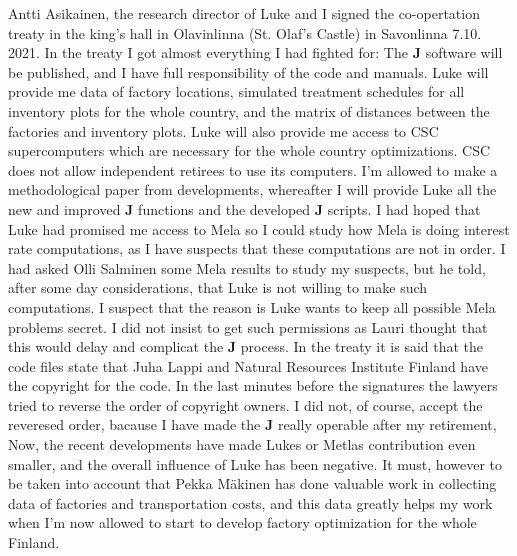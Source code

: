 Antti Asikainen, the research director of Luke and I signed the co-opertation treaty in the king's hall in
Olavinlinna (St. Olaf's Castle) in Savonlinna 7.10. 2021.
In the treaty I got almost everything I had
fighted for: The \textbf{J} software will be published, and I have
full responsibility of the code and manuals.
Luke will provide me data of factory locations, simulated treatment schedules for
all inventory plots for the whole country, and the matrix of distances between the
factories and inventory plots. Luke will also provide me access to CSC
supercomputers which are necessary for the whole country optimizations. CSC does not allow
independent retirees to use its computers. I'm allowed to make a methodological
paper from developments, whereafter I will provide Luke all the
new and improved \textbf{J} functions and the developed \textbf{J} scripts. I had hoped that
Luke had promised me access to Mela so I could study how Mela is doing interest
rate computations, as I have suspects that these computations are not in order.
I had asked Olli Salminen some Mela results to study my suspects, but he told, after some
day considerations, that Luke is not willing to make such computations.
I suspect that the reason is
Luke wants to keep all possible Mela problems secret. I did not insist to get
such permissions as Lauri thought that this would delay and complicat
the \textbf{J} process. In the treaty it
is said that the code files state that Juha Lappi
and Natural Resources Institute Finland have the copyright for the code.
In the last minutes
before the signatures
the lawyers tried to reverse the order of copyright owners. I did not, of course,
accept the reveresed order, bacause I have made the \textbf{J} really operable after my retirement,
Now, the recent developments have made Lukes or Metlas contribution
even smaller, and the overall influence of Luke has been negative.
It must, however to be taken into account that Pekka M\"akinen has done valuable
work in collecting data of factories and
transportation costs, and this data greatly helps my work when I'm now allowed
to start to develop factory optimization for the whole Finland.
